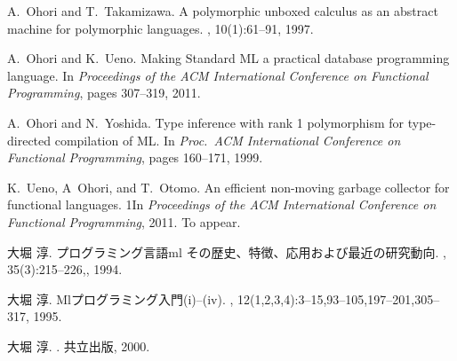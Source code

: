 \documentclass{jbook}
\begin{document}
\begin{thebibliography}{10}
A.~Ohori and T.~Takamizawa.
\newblock A polymorphic unboxed calculus as an abstract machine for polymorphic
  languages.
, 10(1):61--91, 1997.

A.~Ohori and K.~Ueno.
\newblock Making {Standard ML} a practical database programming language.
\newblock In {\em Proceedings of the ACM International Conference on Functional
  Programming}, pages 307--319, 2011.

A.~Ohori and N.~Yoshida.
\newblock Type inference with rank 1 polymorphism for type-directed compilation
  of {ML}.
\newblock In {\em Proc.\ ACM International Conference on Functional
  Programming}, pages 160--171, 1999.

K.~Ueno, A~Ohori, and T.~Otomo.
\newblock An efficient non-moving garbage collector for functional languages.
1\newblock In {\em Proceedings of the ACM International Conference on Functional
  Programming}, 2011.
\newblock To appear.

大堀 淳.
\newblock プログラミング言語ml その歴史、特徴、応用および最近の研究動向.
, 35(3):215--226,, 1994.

大堀 淳.
\newblock Mlプログラミング入門(i)--(iv).
,
  12(1,2,3,4):3--15,93--105,197--201,305--317, 1995.

大堀 淳.
.
\newblock 共立出版, 2000.

\end{thebibliography}
\end{document}
